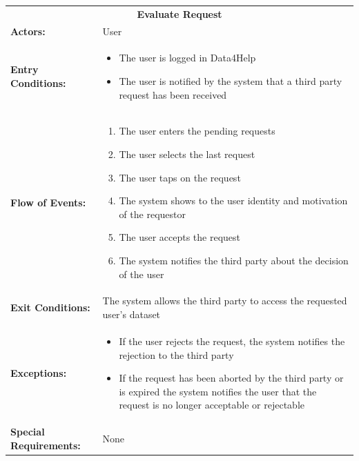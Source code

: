 \begin{table}[H]
	\centering
	{\renewcommand{\arraystretch}{1.5}%
		\begin{tabular}{|@{\hspace{2em}} p{4cm} @{}| p{11cm} @{\qquad}|}
			\cline{1-2}
			\multicolumn{2}{|c|}{\textbf{Evaluate Request}} \\ \cline{1-2}
			\textbf{Actors:} & User \\ \cline{1-2}
			\textbf{Entry Conditions:} & \begin{itemize}[itemsep=-0.2em, topsep=0em]
				\item The user is logged in Data4Help
				\item The user is notified by the system that a third party request has been received
			\end{itemize} \\ \cline{1-2}
			\textbf{Flow of Events:} & \begin{enumerate}[itemsep=-0.2em, topsep=0em]
				\item The user enters the pending requests
				\item The user selects the last request
				\item The user taps on the request 
				\item The system shows to the user identity and motivation of the requestor
				\item The user accepts the request
				\item The system notifies the third party about the decision of the user
			\end{enumerate} \\ \cline{1-2}
			\textbf{Exit Conditions:} & The system allows the third party to access the requested user's dataset\\ \cline{1-2}
			\textbf{Exceptions:} & 
			\begin{itemize}[itemsep=-0.2em, topsep=0em]
				\item If the user rejects the request, the system notifies the rejection to the third party
				\item If the request has been aborted by the third party or is expired  the system notifies the user that the request is no longer acceptable or rejectable
			\end{itemize} \\ \cline{1-2}
			\textbf{Special Requirements: } & None \\ \hline
	\end{tabular}} \quad
\end{table}

